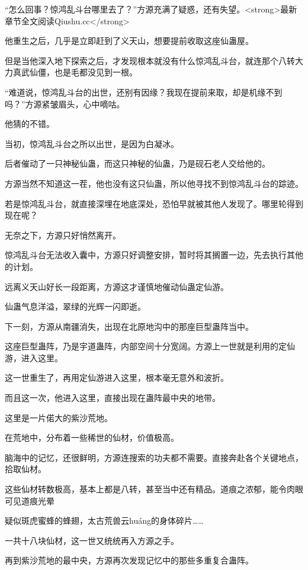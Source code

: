 
\begin{this_body}

“怎么回事？惊鸿乱斗台哪里去了？”方源充满了疑惑，还有失望。<strong>最新章节全文阅读Qiushu.cc</strong>

他重生之后，几乎是立即赶到了义天山，想要提前收取这座仙蛊屋。

但是当他深入地下探索之后，才发现根本就没有什么惊鸿乱斗台，就连那个八转大力真武仙僵，也是毛都没见到一根。

“难道说，惊鸿乱斗台的出世，还别有因缘？我现在提前来取，却是机缘不到吗？”方源紧皱眉头，心中嘀咕。

他猜的不错。

当初，惊鸿乱斗台之所以出世，是因为白凝冰。

后者催动了一只神秘仙蛊，而这只神秘的仙蛊，乃是砚石老人交给他的。

方源当然不知道这一茬，他也没有这只仙蛊，所以他寻找不到惊鸿乱斗台的踪迹。

若是惊鸿乱斗台，就直接深埋在地底深处，恐怕早就被其他人发现了。哪里轮得到现在呢？

无奈之下，方源只好悄然离开。

惊鸿乱斗台无法收入囊中，方源只好调整安排，暂时将其搁置一边，先去执行其他的计划。

远离义天山好长一段距离，方源这才谨慎地催动仙蛊定仙游。

仙蛊气息洋溢，翠绿的光辉一闪即逝。

下一刻，方源从南疆消失，出现在北原地沟中的那座巨型蛊阵当中。

这座巨型蛊阵，乃是宇道蛊阵，内部空间十分宽阔。方源上一世就是利用的定仙游，进入这里。

这一世重生了，再用定仙游进入这里，根本毫无意外和波折。

而且这一次，他进入这里，直接出现在蛊阵最中央的地带。

这里是一片偌大的紫沙荒地。

在荒地中，分布着一些稀世的仙材，价值极高。

脑海中的记忆，还很鲜明，方源连搜索的功夫都不需要。直接奔赴各个关键地点，拾取仙材。

这些仙材转数极高，基本上都是八转，甚至当中还有精品。道痕之浓郁，能令肉眼可见道痕光晕

疑似斑虎蜜蜂的蜂翅，太古荒兽云huáng的身体碎片……

一共十八块仙材，这一世又统统再入方源之手。

再到紫沙荒地的最中央，方源再次发现记忆中的那些多重复合蛊阵。


\end{this_body}
